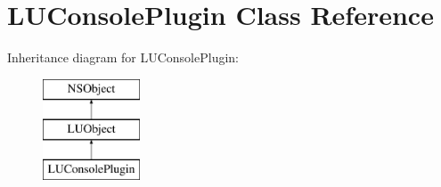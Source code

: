 \hypertarget{interface_l_u_console_plugin}{}\section{L\+U\+Console\+Plugin Class Reference}
\label{interface_l_u_console_plugin}
Inheritance diagram for L\+U\+Console\+Plugin\+:\begin{figure}[H]
\begin{center}
\leavevmode
\includegraphics[height=3.000000cm]{interface_l_u_console_plugin}
\end{center}
\end{figure}
